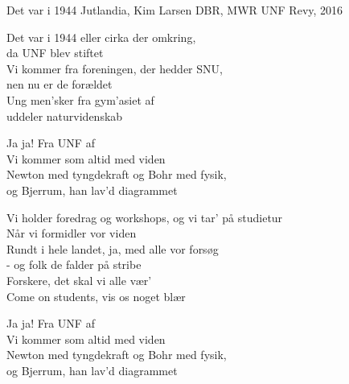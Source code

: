 \begin{song}{Det var i 1944}
  {} %
  {Jutlandia, Kim Larsen} %
  {DBR, MWR} %
  {UNF Revy, 2016} %
  {\NotCCLIed} %

  \begin{SBVerse}
    Det var i 1944 eller cirka der omkring,\\
    da UNF blev stiftet\\
    Vi kommer fra foreningen, der hedder SNU,\\
    nen nu er de forældet\\
    Ung men’sker fra gym’asiet af\\
    uddeler naturvidenskab
  \end{SBVerse}

  \begin{SBChorus}
    Ja ja! Fra UNF af\\
    Vi kommer som altid med viden\\
    Newton med tyngdekraft og Bohr med fysik,\\
    og Bjerrum, han lav’d diagrammet
  \end{SBChorus}

  \begin{SBVerse}
    Vi holder foredrag og workshops, og vi tar’ på studietur\\
    Når vi formidler vor viden\\
    Rundt i hele landet, ja, med alle vor forsøg\\
    - og folk de falder på stribe\\
    Forskere, det skal vi alle vær’\\
    Come on students, vis os noget blær
  \end{SBVerse}

  \begin{SBChorus}
    Ja ja! Fra UNF af\\
    Vi kommer som altid med viden\\
    Newton med tyngdekraft og Bohr med fysik,\\
    og Bjerrum, han lav’d diagrammet
  \end{SBChorus}



\end{song}
